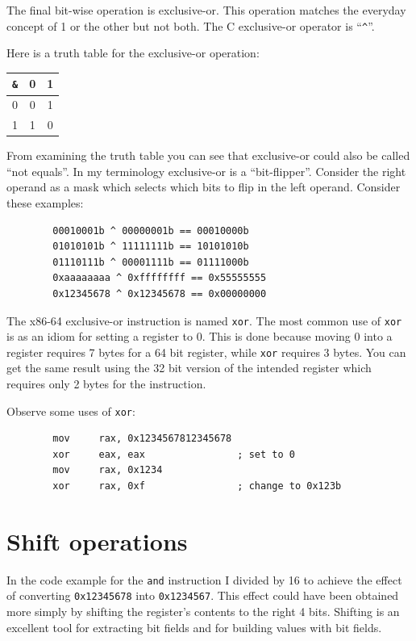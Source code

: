 \documentclass[11pt,b5paper]{book}
\begin{document}
The final bit-wise operation is exclusive-or.  
This operation matches the everyday concept of 1 or the other but not both.
The C exclusive-or operator is ``{\tt \textasciicircum}''.

Here is a truth table for the exclusive-or operation:
\begin{center}
\begin{tabular}{c|cc}
{\tt \&} & 0 & 1 \\
\hline
0       & 0 & 1 \\
1       & 1 & 0 \\
\end{tabular}
\end{center}

From examining the truth table you can see that exclusive-or could also
be called ``not equals''.
In my terminology exclusive-or is a ``bit-flipper''.
Consider the right operand as a mask which selects which bits to flip
in the left operand.
Consider these examples:
\begin{verbatim}
        00010001b ^ 00000001b == 00010000b
        01010101b ^ 11111111b == 10101010b
        01110111b ^ 00001111b == 01111000b
        0xaaaaaaaa ^ 0xffffffff == 0x55555555
        0x12345678 ^ 0x12345678 == 0x00000000
\end{verbatim}

The x86-64 exclusive-or instruction is named {\tt xor}.
The most common use of {\tt xor} is as an idiom for setting a register to 0.
This is done because moving 0 into a register requires 7 bytes for a 64 bit
register, while {\tt xor} requires 3 bytes.
You can get the same result using the 32 bit version of the intended register
which requires only 2 bytes for the instruction.

Observe some uses of {\tt xor}:
\begin{verbatim}
        mov     rax, 0x1234567812345678
        xor     eax, eax                ; set to 0
        mov     rax, 0x1234
        xor     rax, 0xf                ; change to 0x123b
\end{verbatim}

\section{Shift operations}

In the code example for the {\tt and} instruction I divided by 16 to achieve 
the effect of converting {\tt 0x12345678} into {\tt 0x1234567}.
This effect could have been obtained more simply by shifting the register's
contents to the right 4 bits.
Shifting is an excellent tool for extracting bit fields and for building
values with bit fields.
\end{document}
